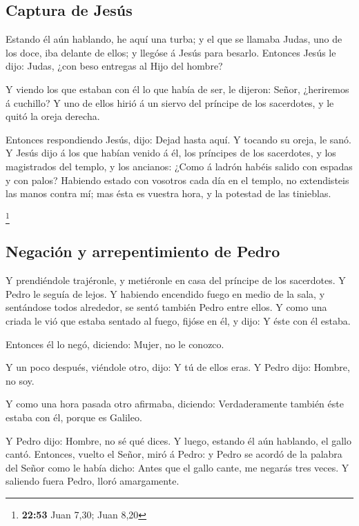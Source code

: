 \hypertarget{captura-de-jesuxfas}{%
\subsection{Captura de Jesús}\label{captura-de-jesuxfas}}

 Estando él aún hablando, he aquí una turba; y el que se
llamaba Judas, uno de los doce, iba delante de ellos; y llegóse á Jesús
para besarlo.  Entonces Jesús le dijo: Judas, ¿con beso
entregas al Hijo del hombre?

 Y viendo los que estaban con él lo que había de ser, le
dijeron: Señor, ¿heriremos á cuchillo?  Y uno de ellos
hirió á un siervo del príncipe de los sacerdotes, y le quitó la oreja
derecha.

 Entonces respondiendo Jesús, dijo: Dejad hasta aquí. Y
tocando su oreja, le sanó.  Y Jesús dijo á los que habían
venido á él, los príncipes de los sacerdotes, y los magistrados del
templo, y los ancianos: ¿Como á ladrón habéis salido con espadas y con
palos?  Habiendo estado con vosotros cada día en el templo,
no extendisteis las manos contra mí; mas ésta es vuestra hora, y la
potestad de las tinieblas.

\footnote{\textbf{22:53} Juan 7,30; Juan 8,20}

\hypertarget{negaciuxf3n-y-arrepentimiento-de-pedro}{%
\subsection{Negación y arrepentimiento de
Pedro}\label{negaciuxf3n-y-arrepentimiento-de-pedro}}

 Y prendiéndole trajéronle, y metiéronle en casa del
príncipe de los sacerdotes. Y Pedro le seguía de lejos.  Y
habiendo encendido fuego en medio de la sala, y sentándose todos
alrededor, se sentó también Pedro entre ellos.  Y como una
criada le vió que estaba sentado al fuego, fijóse en él, y dijo: Y éste
con él estaba.

 Entonces él lo negó, diciendo: Mujer, no le conozco.

 Y un poco después, viéndole otro, dijo: Y tú de ellos
eras. Y Pedro dijo: Hombre, no soy.

 Y como una hora pasada otro afirmaba, diciendo:
Verdaderamente también éste estaba con él, porque es Galileo.

 Y Pedro dijo: Hombre, no sé qué dices. Y luego, estando él
aún hablando, el gallo cantó.  Entonces, vuelto el Señor,
miró á Pedro: y Pedro se acordó de la palabra del Señor como le había
dicho: Antes que el gallo cante, me negarás tres veces.  Y
saliendo fuera Pedro, lloró amargamente.

